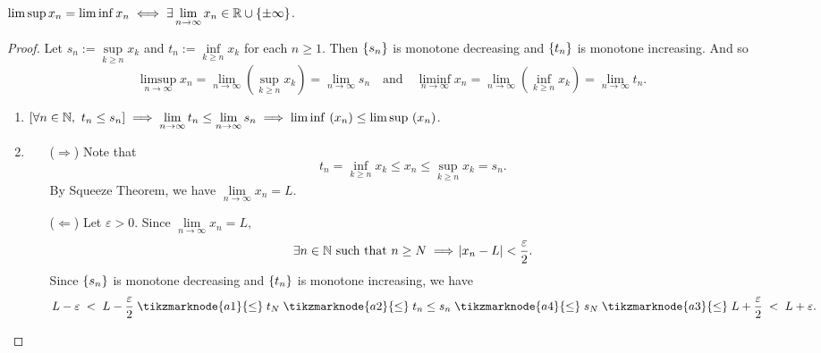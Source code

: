 \documentclass[11pt,openany]{article}
\begin{document}
\begin{remark*}
$\limsup x_n=\liminf x_n\iff\exists\lim\limits_{n\to\infty}x_n\in\R\cup\set{\pm\infty}$.
\end{remark*}
\begin{proof}
Let $s_n:=\sup\limits_{k\geq n}x_k$ and $t_n:=\inf\limits_{k\geq n}x_k$ for each $n\geq 1$. Then $\set{s_n}$ is monotone decreasing and $\set{t_n}$ is monotone increasing. And so \[
\limsup\limits_{n \to \infty} x_n=\lim\limits_{n \to \infty} \left(\sup\limits_{k\geq n}x_k\right)=\lim\limits_{n\to\infty}s_n\quad\text{and}\quad\liminf\limits_{n \to \infty} x_n=\lim\limits_{n \to \infty} \left(\inf\limits_{k\geq n}x_k\right)=\lim\limits_{n \to \infty} t_n.
\]\begin{enumerate}[(1)]
	\item $[\forall n\in\N,\ t_n\leq s_n]\implies\lim\limits_{n \to \infty}t_n\leq \lim\limits_{n \to \infty}s_n\implies\liminf\ (x_n)\leq\limsup\ (x_n)$.
	\item \begin{itemize}
		\item[($\Rightarrow$)] Note that \[
		t_n=\inf\limits_{k\geq n} x_k\leq x_n\leq\sup\limits_{k\geq n} x_k=s_n.
		\] By Squeeze Theorem, we have $\lim\limits_{n\to\infty}x_n=L$.
		\item[($\Leftarrow$)] Let $\varepsilon>0$. Since $\lim\limits_{n\to\infty}x_n=L$, \[
		\exists n\in\N\ \text{such that}\ n\geq N\implies\abs{x_n-L}<\frac{\varepsilon}{2}.
		\] Since $\set{s_n}$ is monotone decreasing and $\set{t_n}$ is monotone increasing, we have \begin{align*}
			L-\varepsilon \;<\; L-\frac{\varepsilon}{2} \;\tikzmarknode{a1}{\leq}\; t_N \;\tikzmarknode{a2}{\leq}\; t_n \;{\leq}\; s_n \;\tikzmarknode{a4}{\leq}\; s_N \;\tikzmarknode{a3}{\leq}\; L+\frac{\varepsilon}{2} \;<\; L+\varepsilon.
		\end{align*}
		\begin{tikzpicture}[remember picture, overlay, font=\sffamily]

\end{tikzpicture}
\end{itemize}
\end{enumerate}
\end{proof}
\end{document}
